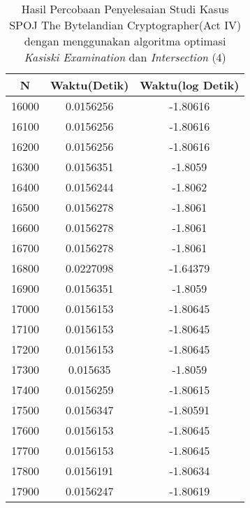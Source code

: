 \begin{table}[H]
\centering
\caption {Hasil Percobaan Penyelesaian Studi Kasus SPOJ The Bytelandian Cryptographer(Act IV) dengan menggunakan algoritma optimasi \textit{Kasiski Examination} dan \textit{Intersection} (4)}
\begin{tabular}{|c|c|c|}\hline
N&Waktu(Detik)&Waktu(log Detik)\\ \hline
16000&0.0156256&-1.80616\\ \hline
16100&0.0156256&-1.80616\\ \hline
16200&0.0156256&-1.80616\\ \hline
16300&0.0156351&-1.8059\\ \hline
16400&0.0156244&-1.8062\\ \hline
16500&0.0156278&-1.8061\\ \hline
16600&0.0156278&-1.8061\\ \hline
16700&0.0156278&-1.8061\\ \hline
16800&0.0227098&-1.64379\\ \hline
16900&0.0156351&-1.8059\\ \hline
17000&0.0156153&-1.80645\\ \hline
17100&0.0156153&-1.80645\\ \hline
17200&0.0156153&-1.80645\\ \hline
17300&0.015635&-1.8059\\ \hline
17400&0.0156259&-1.80615\\ \hline
17500&0.0156347&-1.80591\\ \hline
17600&0.0156153&-1.80645\\ \hline
17700&0.0156153&-1.80645\\ \hline
17800&0.0156191&-1.80634\\ \hline
17900&0.0156247&-1.80619\\ \hline
\end{tabular}
\label{tab:res9}
\end{table}
